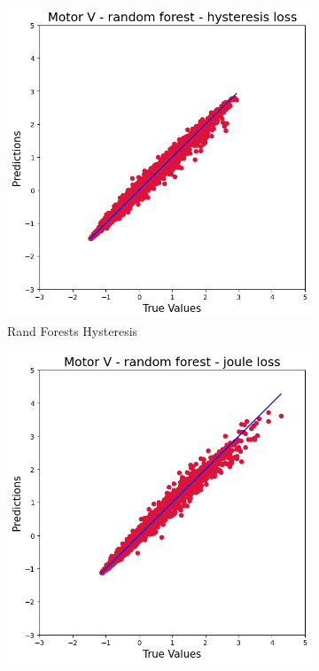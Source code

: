\documentclass{article}
\begin{document}
\begin{figure}[!htbp]
    \begin{subfigure}[b]{0.23\textwidth}
        \centering
        \includegraphics[width=\textwidth]{images/V/rand_for_hysteresis.png}
        \caption{Rand Forests Hysteresis}
    \end{subfigure}
    \hfill
    \begin{subfigure}[b]{0.23\textwidth}
        \centering
        \includegraphics[width=\textwidth]{images/V/rand_for_joule.png}

\end{subfigure}
\end{figure}
\end{document}
